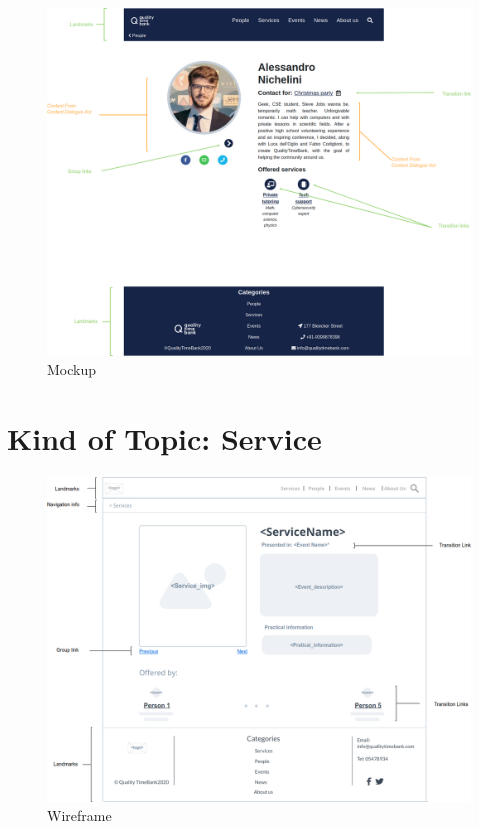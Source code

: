 \documentclass[a4paper, 11pt, parskip=half, headsepline]{scrreprt}
\begin{document}
\begin{figure}[H]
    \centering
    \includegraphics[width=1\linewidth, keepaspectratio]{mockups/ConcretePerson}
    \caption{Mockup}
\end{figure}

\section{Kind of Topic: Service}

\begin{figure}[H]
    \centering
    \includegraphics[width=1\linewidth, keepaspectratio]{wireframes/KindOfTopic-Service}
    \caption{Wireframe}
\end{figure}
\end{document}
